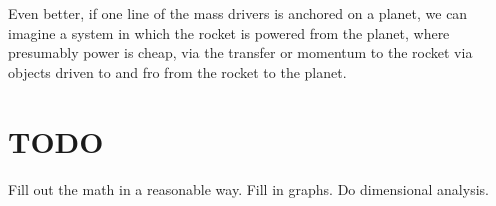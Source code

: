 \documentclass[11pt]{article}
\begin{document}
Even better, if one line of the mass drivers is anchored on a planet, we can
imagine a system in which the rocket is powered from the planet, where presumably power
is cheap, via the transfer or momentum to the rocket via objects driven to and fro from
the rocket to the planet.

\section{TODO}

Fill out the math in a reasonable way.  Fill in graphs. Do dimensional analysis.
\end{document}
